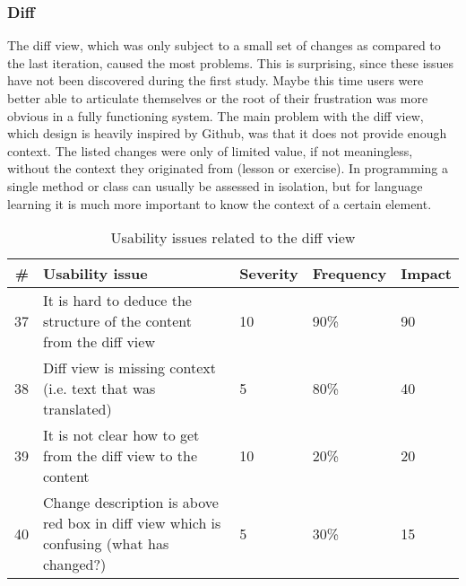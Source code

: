\subsubsection{Diff}
The diff view, which was only subject to a small set of changes as compared to the last iteration, caused the most problems. This is surprising, since these issues have not been discovered during the first study. Maybe this time users were better able to articulate themselves or the root of their frustration was more obvious in a fully functioning system. The main problem with the diff view, which design is heavily inspired by Github, was that it does not provide enough context. The listed changes were only of limited value, if not meaningless, without the context they originated from (lesson or exercise). In programming a single method or class can usually be assessed in isolation, but for language learning it is much more important to know the context of a certain element.



\begin{table}[h!]
\centering
\begin{tabular}{|r|p{7cm}|l|l|l|}
\hline
\rowcolor[HTML]{EFEFEF}
{\bf \#} & {\bf Usability issue} & {\bf Severity} & {\bf Frequency} & {\bf Impact} \\ \hline
37 & It is hard to deduce the structure of the content from the diff view & 10 & 90\% & 90 \\ \hline
38 & Diff view is missing context (i.e. text that was translated) & 5 & 80\% & 40 \\ \hline
39 & It is not clear how to get from the diff view to the content & 10 & 20\% & 20 \\ \hline
40 & Change description is above red box in diff view which is confusing (what has changed?) & 5 & 30\% & 15 \\ \hline
\end{tabular}
\caption{Usability issues related to the diff view}
\label{table:issues-diff-2nd}
\end{table}


